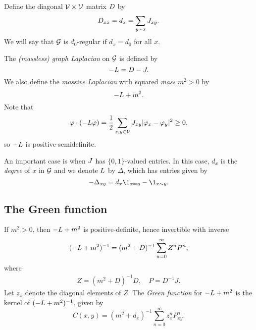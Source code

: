 Define the diagonal $\mathcal{V}\times\mathcal{V}$ matrix $D$ by
\begin{equation}
D_{xx} = d_x = \sum_{y \sim x} J_{xy}.
\end{equation}
We will say that $\mathcal{G}$ is $d_0$-regular if $d_x = d_0$ for all $x$.

The \emph{(massless) graph Laplacian} on $\mathcal{G}$ is defined by
\begin{equation}
-L = D - J.
\end{equation}
We also define the \emph{massive Laplacian} with squared \emph{mass} $m^2 > 0$
by
\begin{equation}
-L + m^2.
\end{equation}
Note that
\begin{equation}
\varphi \cdot (-L \varphi)
  =
\frac{1}{2} \sum_{x,y\in\mathcal{V}} J_{xy} |\varphi_x - \varphi_y|^2
  \ge
0,
\end{equation}
so $-L$ is positive-semidefinite.

\begin{example}
An important case is when $J$ has $\{0, 1 \}$-valued entries. In this case, $d_x$ is the \emph{degree} of $x$ in $\mathcal{G}$ and we denote $L$ by
$\Delta$, which has entries given by
\begin{equation}
-\Delta_{xy} = d_x \1_{x=y} - \1_{x \sim y}.
\end{equation}
\end{example}


\subsection{The Green function}

If $m^2 > 0$, then $-L + m^2$ is positive-definite, hence invertible with inverse
\begin{equation}
(-L + m^2)^{-1} = (m^2 + D)^{-1} \sum_{n=0}^\infty Z^n P^n,
\end{equation}
where
\begin{align}
Z = (m^2 + D)^{-1} D,
  \quad
P = D^{-1} J.
\end{align}
Let $z_x$ denote the diagonal elements of $Z$. The \emph{Green function} for
$-L + m^2$ is the kernel of $(-L + m^2)^{-1}$, given by
\begin{equation}
C(x, y)
  =
(m^2 + d_x)^{-1} \sum_{n=0}^\infty z_x^n P^n_{xy}.
\end{equation}


